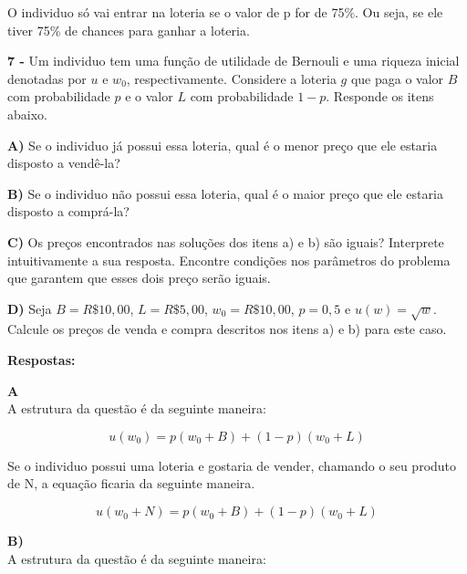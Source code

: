 \begin{flushleft}
O individuo só vai entrar na loteria se o valor de p for de 75\%. Ou seja, se ele tiver 75\% de chances para ganhar a loteria.

\singlespacing

\textbf{7 -} Um individuo tem uma função de utilidade de Bernouli e uma riqueza inicial denotadas por $u$ e $w_{0}$, respectivamente. Considere a loteria $g$ que paga o valor $B$ com probabilidade $p$ e o valor $L$ com probabilidade $1 - p$. Responde os itens abaixo.

\singlespacing

\textbf{A)} Se o individuo já possui essa loteria, qual é o menor preço que ele estaria disposto a vendê-la?

\singlespacing

\textbf{B)} Se o individuo não possui essa loteria, qual é o maior preço que ele estaria disposto a comprá-la?

\singlespacing

\textbf{C)} Os preços encontrados nas soluções dos itens a) e b) são iguais? Interprete intuitivamente a sua resposta. Encontre condições nos parâmetros do problema que garantem que esses
dois preço serão iguais.

\singlespacing

\textbf{D)} Seja $B = R\$ 10,00$, $L = R\$ 5,00$, $w_{0} = R\$ 10,00$, $p = 0,5$ e $u(w) = \sqrt{w}$. Calcule os preços de venda e compra descritos nos itens a) e b) para este caso.

\singlespacing

\textbf{Respostas:}

\singlespacing

\textbf{A}
\\
A estrutura da questão é da seguinte maneira:

\begin{equation}
	u(w_{0}) = p(w_{0} + B) + (1 - p)(w_{0} + L)
\end{equation}

Se o individuo possui uma loteria e gostaria de vender, chamando o seu produto de N, a equação ficaria da seguinte maneira.

\begin{equation}
	u(w_{0} + N) = p(w_{0} + B) + (1 - p)(w_{0} + L)
\end{equation}

\singlespacing 

\textbf{B)} 
\\
A estrutura da questão é da seguinte maneira:


\end{flushleft}
